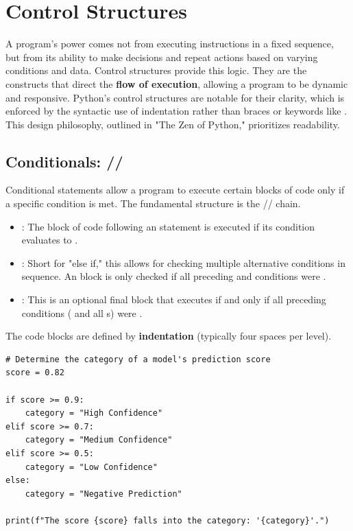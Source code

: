 \section{Control Structures}
\label{sec:control_structures}
A program's power comes not from executing instructions in a fixed sequence, but from its ability to make decisions and repeat actions based on varying conditions and data. Control structures provide this logic. They are the constructs that direct the \textbf{flow of execution}, allowing a program to be dynamic and responsive. Python's control structures are notable for their clarity, which is enforced by the syntactic use of indentation rather than braces or keywords like . This design philosophy, outlined in "The Zen of Python," prioritizes readability.

\subsection{Conditionals: //}
\label{subsec:conditionals}
Conditional statements allow a program to execute certain blocks of code only if a specific condition is met. The fundamental structure is the // chain.

\begin{itemize}
    \item {}: The block of code following an  statement is executed if its condition evaluates to .
    \item {}: Short for "else if," this allows for checking multiple alternative conditions in sequence. An  block is only checked if all preceding  and  conditions were .
    \item {}: This is an optional final block that executes if and only if all preceding conditions ( and all s) were .
\end{itemize}
The code blocks are defined by \textbf{indentation} (typically four spaces per level).

\begin{example}\text{ }
\text{ }\begin{verbatim}
# Determine the category of a model's prediction score
score = 0.82

if score >= 0.9:
    category = "High Confidence"
elif score >= 0.7:
    category = "Medium Confidence"
elif score >= 0.5:
    category = "Low Confidence"
else:
    category = "Negative Prediction"

print(f"The score {score} falls into the category: '{category}'.")
\end{verbatim}
\end{example}

